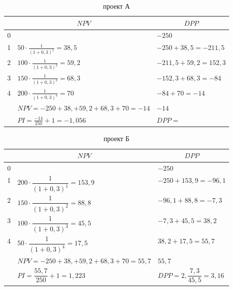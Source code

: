 
\begin{table}[!h]
	\caption{проект А}
	\small
	\setlength{\extrarowheight}{1.2mm}
		\begin{tabularx}{\textwidth}{|K{1.55cm}|p{8cm}|p{6cm}|}
		\hline
		&                       &  \\  &                                                                    &  $    -250   $                 \\  & $50 \cdot \frac{1}{(1+0,3)^1} = 38,5$  &$ -250 +38,5   = -211,5     $            \\  & $100 \cdot \frac{1}{(1+0,3)^2} = 59,2$ & $-211,5  +59,2=152,3      $           \\  & $150 \cdot \frac{1}{(1+0,3)^3} = 68,3$ &$-152,3  +68,3=-84    $             \\  & $200 \cdot \frac{1}{(1+0,3)^4} = 70$  & $-84 +70= -14     $                \\ \hline
		&$NPV = -250+38,+59,2+68,3+70=-14$     & $-14 $                     \\ \hline
		&$PI = \frac{-14}{250}+1=-1,056$                                        & $DPP = $                 \\ \hline
		\end{tabularx}
		\end{table}

\begin{table}[!h]
	\caption{проект Б}
	\small
	\setlength{\extrarowheight}{2.7mm}
	\begin{tabularx}{\textwidth}{|K{1.55cm}|p{5cm}|p{5cm}|}
		\hline
		&                       &  \\  &                                                                    &  $    -250   $                 \\  & $200 \cdot \dfrac{1}{(1+0,3)^1} = 153,9$  &$ -250 +153,9   = -96,1     $            \\  & $150 \cdot \dfrac{1}{(1+0,3)^2} = 88,8$ & $-96,1  +88,8=-7,3      $           \\  & $100 \cdot \dfrac{1}{(1+0,3)^3} = 45,5$ &$-7,3  +45,5=38,2    $             \\  & $50 \cdot \dfrac{1}{(1+0,3)^4} =17,5$  & $38,2 +17,5= 55,7     $                \\ \hline
		&$NPV = -250+38,+59,2+68,3+70=55,7$     & $55,7 $                     \\ \hline
		&$PI = \dfrac{55,7}{250}+1=1,223$                                        & $DPP = 2,\dfrac{7,3}{45,5}=3,16$                 \\ \hline
	\end{tabularx}
\end{table}

